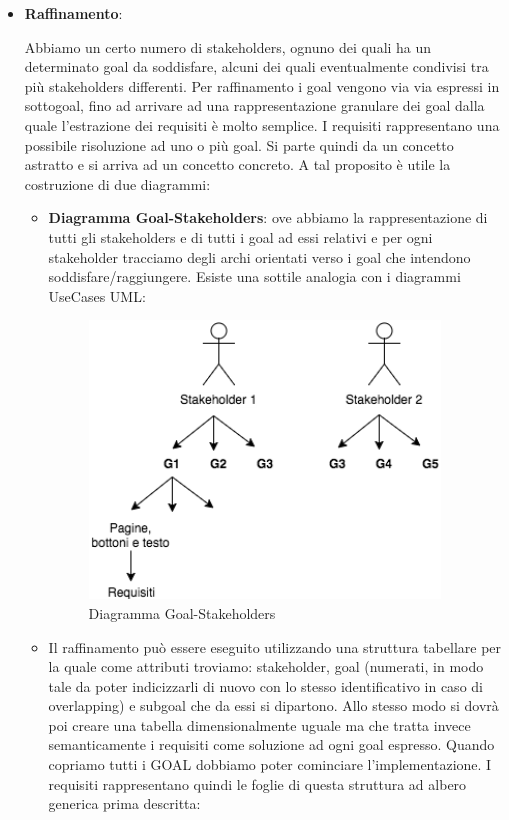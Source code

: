\begin{itemize}

\item{\textbf{Raffinamento}}:

Abbiamo un certo numero di stakeholders, ognuno dei quali ha un determinato goal da soddisfare, alcuni dei quali eventualmente condivisi tra più stakeholders differenti. Per raffinamento i goal vengono via via espressi in sottogoal, fino ad arrivare ad una rappresentazione granulare dei goal dalla quale l’estrazione dei requisiti è molto semplice. I requisiti rappresentano una possibile risoluzione ad uno o più goal. Si parte quindi da un concetto astratto e si arriva ad un concetto concreto.   
A tal proposito è utile la costruzione di due diagrammi:

\begin{itemize}

\item{\textbf{Diagramma Goal-Stakeholders}}: ove abbiamo la rappresentazione di tutti gli stakeholders e di tutti i goal ad essi relativi e per ogni stakeholder tracciamo degli 
archi orientati verso i goal che intendono soddisfare/raggiungere. Esiste una sottile analogia con i diagrammi UseCases UML:

\begin{center}
\begin{figure}[H]
\centering
\includegraphics[scale=1]{figures/goal_stakeholders.png}
\caption{Diagramma Goal-Stakeholders} 
\end{figure}
\end{center}

\item  Il raffinamento può essere eseguito utilizzando una struttura tabellare per la quale come attributi troviamo: stakeholder, goal (numerati, in modo tale da poter indicizzarli di nuovo con lo stesso identificativo in caso di overlapping) e subgoal che da essi si dipartono. Allo stesso modo si dovrà poi creare una tabella dimensionalmente uguale ma che tratta invece semanticamente i requisiti come soluzione ad ogni goal espresso. Quando copriamo tutti i GOAL dobbiamo poter cominciare l'implementazione. I requisiti rappresentano quindi le foglie di questa struttura ad albero generica prima descritta:


\end{itemize}
\end{itemize}
